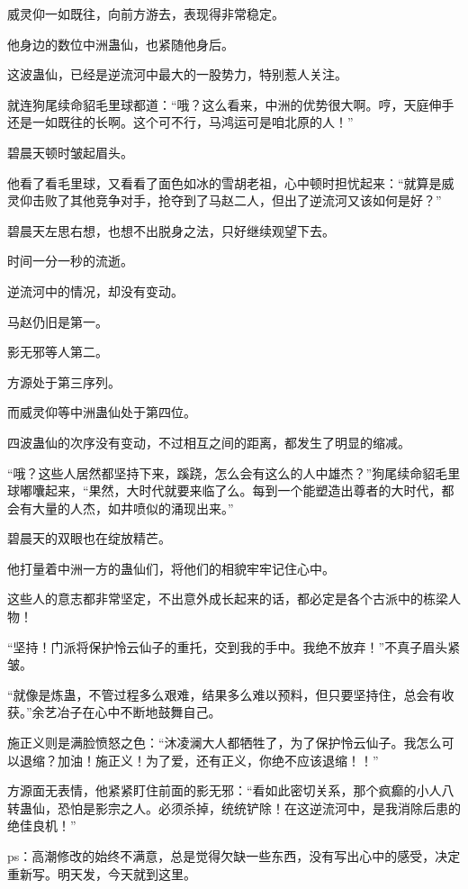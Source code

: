 \begin{this_body}
威灵仰一如既往，向前方游去，表现得非常稳定。

他身边的数位中洲蛊仙，也紧随他身后。

这波蛊仙，已经是逆流河中最大的一股势力，特别惹人关注。

就连狗尾续命貂毛里球都道：“哦？这么看来，中洲的优势很大啊。哼，天庭伸手还是一如既往的长啊。这个可不行，马鸿运可是咱北原的人！”

碧晨天顿时皱起眉头。

他看了看毛里球，又看看了面色如冰的雪胡老祖，心中顿时担忧起来：“就算是威灵仰击败了其他竞争对手，抢夺到了马赵二人，但出了逆流河又该如何是好？”

碧晨天左思右想，也想不出脱身之法，只好继续观望下去。

时间一分一秒的流逝。

逆流河中的情况，却没有变动。

马赵仍旧是第一。

影无邪等人第二。

方源处于第三序列。

而威灵仰等中洲蛊仙处于第四位。

四波蛊仙的次序没有变动，不过相互之间的距离，都发生了明显的缩减。

“哦？这些人居然都坚持下来，蹊跷，怎么会有这么的人中雄杰？”狗尾续命貂毛里球嘟囔起来，“果然，大时代就要来临了么。每到一个能塑造出尊者的大时代，都会有大量的人杰，如井喷似的涌现出来。”

碧晨天的双眼也在绽放精芒。

他打量着中洲一方的蛊仙们，将他们的相貌牢牢记住心中。

这些人的意志都非常坚定，不出意外成长起来的话，都必定是各个古派中的栋梁人物！

“坚持！门派将保护怜云仙子的重托，交到我的手中。我绝不放弃！”不真子眉头紧皱。

“就像是炼蛊，不管过程多么艰难，结果多么难以预料，但只要坚持住，总会有收获。”余艺冶子在心中不断地鼓舞自己。

施正义则是满脸愤怒之色：“沐凌澜大人都牺牲了，为了保护怜云仙子。我怎么可以退缩？加油！施正义！为了爱，还有正义，你绝不应该退缩！！”

方源面无表情，他紧紧盯住前面的影无邪：“看如此密切关系，那个疯癫的小人八转蛊仙，恐怕是影宗之人。必须杀掉，统统铲除！在这逆流河中，是我消除后患的绝佳良机！”

ps：高潮修改的始终不满意，总是觉得欠缺一些东西，没有写出心中的感受，决定重新写。明天发，今天就到这里。

\end{this_body}

